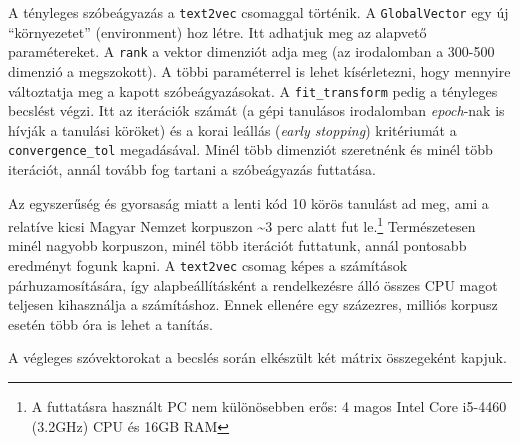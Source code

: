 \documentclass[
]{book}
\newenvironment{Shaded}{\begin{snugshade}}{\end{snugshade}}
\newcommand{\AttributeTok}[1]{\textcolor[rgb]{0.77,0.63,0.00}{#1}}
\newcommand{\DecValTok}[1]{\textcolor[rgb]{0.00,0.00,0.81}{#1}}
\newcommand{\FloatTok}[1]{\textcolor[rgb]{0.00,0.00,0.81}{#1}}
\newcommand{\FunctionTok}[1]{\textcolor[rgb]{0.00,0.00,0.00}{#1}}
\newcommand{\NormalTok}[1]{#1}
\newcommand{\OtherTok}[1]{\textcolor[rgb]{0.56,0.35,0.01}{#1}}
\newcommand{\SpecialCharTok}[1]{\textcolor[rgb]{0.00,0.00,0.00}{#1}}
\begin{document}
A tényleges szóbeágyazás a \texttt{text2vec} csomaggal történik. A
\texttt{GlobalVector} egy új ``környezetet'' (environment) hoz létre.
Itt adhatjuk meg az alapvető paramétereket. A \texttt{rank} a vektor
dimenziót adja meg (az irodalomban a 300-500 dimenzió a megszokott). A
többi paraméterrel is lehet kísérletezni, hogy mennyire változtatja meg
a kapott szóbeágyazásokat. A \texttt{fit\_transform} pedig a tényleges
becslést végzi. Itt az iterációk számát (a gépi tanulásos irodalomban
\emph{epoch}-nak is hívják a tanulási köröket) és a korai leállás
(\emph{early stopping}) kritériumát a \texttt{convergence\_tol}
megadásával. Minél több dimenziót szeretnénk és minél több iterációt,
annál tovább fog tartani a szóbeágyazás futtatása.

Az egyszerűség és gyorsaság miatt a lenti kód 10 körös tanulást ad meg,
ami a relatíve kicsi Magyar Nemzet korpuszon \textasciitilde3 perc alatt
fut le.\footnote{A futtatásra használt PC nem különösebben erős: 4 magos
  Intel Core i5-4460 (3.2GHz) CPU és 16GB RAM} Természetesen minél
nagyobb korpuszon, minél több iterációt futtatunk, annál pontosabb
eredményt fogunk kapni. A \texttt{text2vec} csomag képes a számítások
párhuzamosítására, így alapbeállításként a rendelkezésre álló összes CPU
magot teljesen kihasználja a számításhoz. Ennek ellenére egy százezres,
milliós korpusz esetén több óra is lehet a tanítás.

\begin{Shaded}
\end{Shaded}

A végleges szóvektorokat a becslés során elkészült két mátrix
összegeként kapjuk.

\begin{Shaded}
\end{Shaded}
\end{document}
